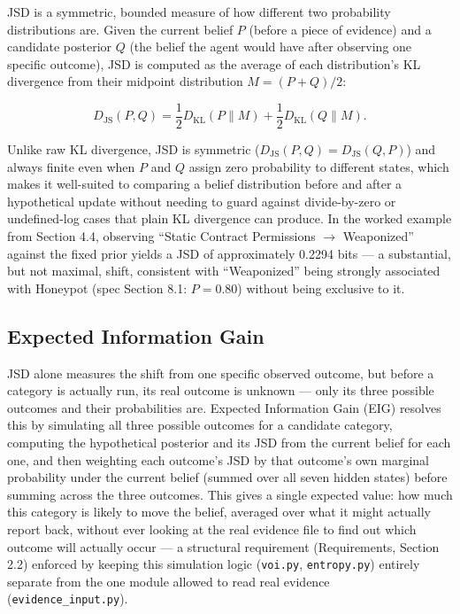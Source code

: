 \documentclass[11pt]{article}
\begin{document}
JSD is a symmetric, bounded measure of how different two probability distributions are. Given the current belief $P$ (before a piece of evidence) and a candidate posterior $Q$ (the belief the agent would have after observing one specific outcome), JSD is computed as the average of each distribution's KL divergence from their midpoint distribution $M=(P+Q)/2$:

\[
D_{\mathrm{JS}}(P,Q)
=
\frac{1}{2}D_{\mathrm{KL}}(P\parallel M)
+
\frac{1}{2}D_{\mathrm{KL}}(Q\parallel M).
\]

Unlike raw KL divergence, JSD is symmetric ($D_{\mathrm{JS}}(P,Q)=D_{\mathrm{JS}}(Q,P)$) and always finite even when $P$ and $Q$ assign zero probability to different states, which makes it well-suited to comparing a belief distribution before and after a hypothetical update without needing to guard against divide-by-zero or undefined-log cases that plain KL divergence can produce. In the worked example from Section 4.4, observing ``Static Contract Permissions $\rightarrow$ Weaponized'' against the fixed prior yields a JSD of approximately 0.2294 bits --- a substantial, but not maximal, shift, consistent with ``Weaponized'' being strongly associated with Honeypot (spec Section 8.1: $P=0.80$) without being exclusive to it.

\subsection{Expected Information Gain}

JSD alone measures the shift from one specific observed outcome, but before a category is actually run, its real outcome is unknown --- only its three possible outcomes and their probabilities are. Expected Information Gain (EIG) resolves this by simulating all three possible outcomes for a candidate category, computing the hypothetical posterior and its JSD from the current belief for each one, and then weighting each outcome's JSD by that outcome's own marginal probability under the current belief (summed over all seven hidden states) before summing across the three outcomes. This gives a single expected value: how much this category is likely to move the belief, averaged over what it might actually report back, without ever looking at the real evidence file to find out which outcome will actually occur --- a structural requirement (Requirements, Section 2.2) enforced by keeping this simulation logic (\texttt{voi.py}, \texttt{entropy.py}) entirely separate from the one module allowed to read real evidence (\texttt{evidence_input.py}).
\end{document}
